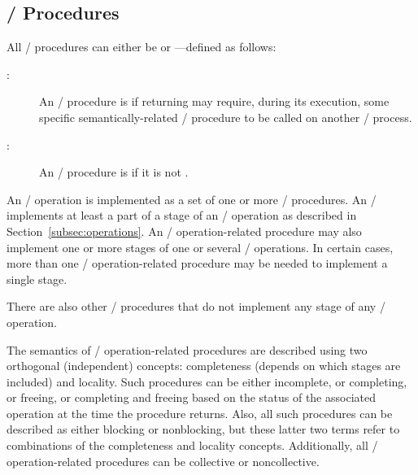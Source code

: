 \subsection{\texorpdfstring{\MPI/}{MPI} Procedures}
\label{subsec:procedures}
All \MPI/ procedures can either be  or ---defined as follows:
\begin{description}
\item[:]
An \MPI/ procedure is  if returning may require, during its execution,
some specific semantically-related \MPI/ procedure to be called on another \MPI/ process.

\item[:]
An \MPI/ procedure is  if it is not .
\end{description}

An \MPI/ operation is implemented as a set of one or more \MPI/
procedures.
An \MPI/ 
implements at least a part of a stage
of an \MPI/ operation as described in Section~\ref{subsec:operations}.
An \MPI/ operation-related procedure may also implement one or more stages of one or several \MPI/ operations.
In certain cases, more than one \MPI/ operation-related procedure may be
needed to implement a single stage.

There are also other \MPI/ procedures that do not
implement any stage of any \MPI/ operation.

The semantics of \MPI/ operation-related procedures are described using two
orthogonal (independent) concepts: completeness (depends on which
stages are included) and locality.  Such procedures can be either
incomplete, or completing, or freeing, or completing and freeing based
on the status of the associated operation at the time the procedure
returns.
Also, all such procedures can be described as either blocking or nonblocking,
but these latter two terms refer to combinations of the completeness
and locality concepts. Additionally, all \MPI/ operation-related procedures can be
collective or noncollective.

